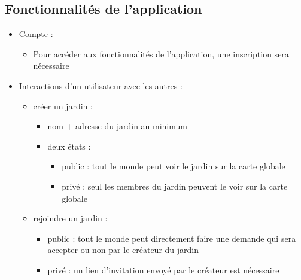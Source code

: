\documentclass[french,a4paper]{article}
\begin{document}
\subsection{Fonctionnalités de l'application}
\begin{itemize}
    \item Compte :
          \begin{itemize}
              \item Pour accéder aux fonctionnalités de l’application, une inscription sera nécessaire
          \end{itemize}
    \item Interactions d’un utilisateur avec les autres :
          \begin{itemize}
              \item créer un jardin :
                    \begin{itemize}
                        \item nom + adresse du jardin au minimum
                        \item deux états :
                              \begin{itemize}
                                  \item public : tout le monde peut voir le jardin sur la carte globale
                                  \item privé : seul les membres du jardin peuvent le voir sur la carte globale
                              \end{itemize}
                    \end{itemize}
              \item rejoindre un jardin :
                    \begin{itemize}
                        \item public : tout le monde peut directement faire une demande qui sera accepter ou non par le créateur du jardin
                        \item privé : un lien d’invitation envoyé par le créateur est nécessaire
                    \end{itemize}


\end{itemize}
\end{itemize}
\end{document}
